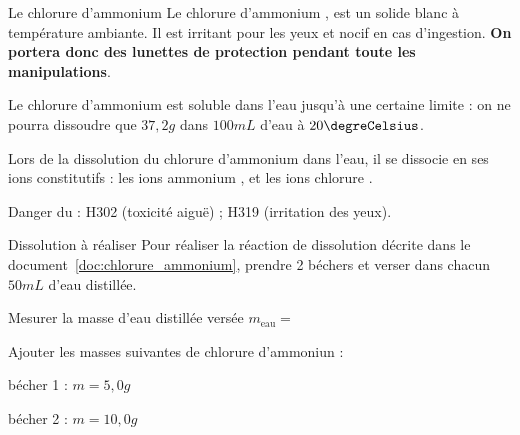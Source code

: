 \begin{doc}{Le chlorure d'ammonium}
  \label{doc:chlorure_ammonium}
  Le chlorure d'ammonium , est un solide blanc à température ambiante.
  Il est irritant pour les yeux et nocif en cas d'ingestion.
  \textbf{On portera donc des lunettes de protection pendant toute les manipulations}.
  
  Le chlorure d'ammonium est soluble dans l'eau jusqu'à une certaine limite : on ne pourra dissoudre que $37,\!2 \unit{g}$ dans $100 \unit{mL}$ d'eau à $20 \degreCelsius$.

  Lors de la dissolution du chlorure d'ammonium dans l'eau, il se dissocie en ses ions constitutifs : les ions ammonium , et les ions chlorure .

  \smallskip
  \attention Danger du  : H302 (toxicité aiguë) ; H319 (irritation des yeux).
\end{doc}
\newpage

\vspace*{-36pt}
\begin{doc}{Dissolution à réaliser}
  \label{doc:dissolution_protocole}
  Pour réaliser la réaction de dissolution décrite dans le document~\ref{doc:chlorure_ammonium}, prendre 2 béchers et verser dans chacun $50 \unit{mL}$ d’eau distillée.
  
  Mesurer la masse d'eau distillée versée $m_\text{eau} =$ 
  
  Ajouter les masses suivantes de chlorure d'ammoniun  :
  \begin{listePoints}
    \item bécher 1 : $m = 5,\!0 \unit{g}$
    \item bécher 2 : $m = 10,\!0 \unit{g}$
  \end{listePoints}
\end{doc}



